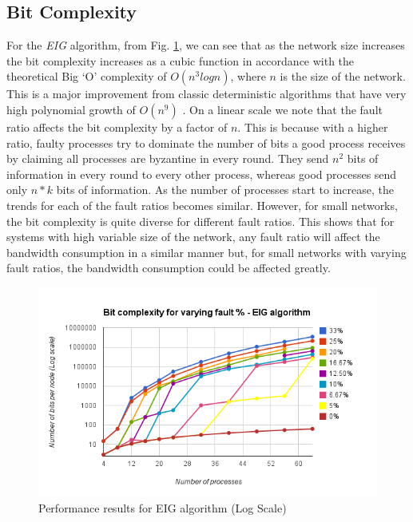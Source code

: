 \subsection{Bit Complexity}
For the \textit{EIG} algorithm, from Fig. \ref{fig:eig}, we can see that as the network size increases the bit complexity increases as a cubic function in accordance with the theoretical Big `O' complexity of $O(n^3 logn)$, where $n$ is the size of the network. This is a major improvement from classic deterministic algorithms that have very high polynomial growth of $O(n^9)$ \cite{GarayM98}. On a linear scale we note that the fault ratio affects the bit complexity by a factor of $n$. This is because with a higher ratio, faulty processes try to dominate the number of bits a good process receives by claiming all processes are byzantine in every round. They send $n^2$ bits of information in every round to every other process, whereas good processes send only $n*k$ bits of information. As the number of processes start to increase, the trends for each of the fault ratios becomes similar. However, for small networks, the bit complexity is quite diverse for different fault ratios. This shows that for systems with high variable size of the network, any fault ratio will affect the bandwidth consumption in a similar manner but, for small networks with varying fault ratios, the bandwidth consumption could be affected greatly.   
\begin{figure}[ht]
 \centering
\includegraphics[scale=0.4]{eig}
\caption{Performance results for EIG algorithm (Log Scale)}
 \label{fig:eig}
\vspace{-2mm}
\end{figure}

